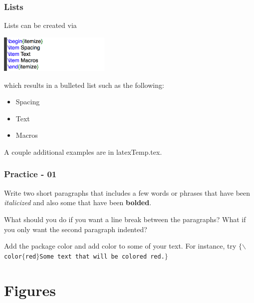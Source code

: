 \documentclass[slidestop,compress,mathserif]{beamer}
\begin{document}
\begin{frame} \frametitle{Lists}
Lists can be created via
\begin{center}
\includegraphics[height=0.7in]{basicsOfLatex/general/list}
\end{center}
which results in a bulleted list such as the following:
\begin{itemize}
\item Spacing
\item Text
\item Macros
\end{itemize}
A couple additional examples are in {\color{highlight}latexTemp.tex}.
\end{frame}

\begin{frame} \frametitle{Practice - 01}
Write two short paragraphs that includes a few words or phrases that have been \textit{italicized} and also some that have been \textbf{bolded}.

\vspace{7mm}

What should you do if you want a line break between the paragraphs? What if you only want the second paragraph indented?

\vspace{7mm}

Add the package {\color{highlight}color} and add color to some of your text. For instance, try 
\texttt{\color{braces}$\{$\color{command}$\backslash$color\color{braces}$\{$\color{black}red\color{braces}$\}$\color{black}Some text that will be colored red.\color{braces}$\}$}
\end{frame}


\section[Figures]{Figures}
\end{document}
